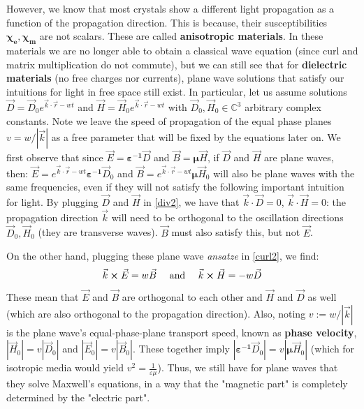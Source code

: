 \documentclass[11pt, a4paper, twoside]{article} %
\newcommand{\C}{\mathbb{C}}
\begin{document}
However, we know that most crystals show a different light propagation as a function of the propagation direction. This is because, their susceptibilities $\pmb{\chi_e},\pmb{\chi_m}$ are not scalars. These are called {\bf anisotropic materials}. In these materials we are no longer able to obtain a classical wave equation (since curl and matrix multiplication do not commute), but we can still see that for {\bf dielectric materials} (no free charges nor currents), plane wave solutions that satisfy our intuitions for light in free space still exist. In particular, let us assume solutions $\vec{D}=\vec{D}_0e^{\vec{k}\cdot\vec{r}-wt}$ and $\vec{H}=\vec{H}_0e^{\vec{k}\cdot\vec{r}-wt}$ with $\vec{D}_0,\vec{H}_0\in\C^3$ arbitrary complex constants. Note we leave the speed of propagation of the equal phase planes $v=w/|\vec{k}|$ as a free parameter that will be fixed by the equations later on. We first observe that since $\vec{E}=\pmb{\varepsilon^{-1}}\vec{D}$ and $\vec{B}=\pmb{\mu}\vec{H}$, if $\vec{D}$ and $\vec{H}$ are plane waves, then: $\vec{E}=e^{\vec{k}\cdot\vec{r}-wt}\pmb{\varepsilon^{-1}}\vec{D}_0$ and $\vec{B}=e^{\vec{k}\cdot\vec{r}-wt}\pmb{\mu}\vec{H}_0$ will also be plane waves with the same frequencies, even if they will not satisfy the following important intuition for light. By plugging $\vec{D}$ and $\vec{H}$ in \eqref{div2}, we have that $\vec{k}\cdot\vec{D}=0$, $\vec{k}\cdot\vec{H}=0$: the propagation direction $\vec{k}$ will need to be orthogonal to the oscillation directions $\vec{D}_0,\vec{H}_0$ (they are transverse waves). $\vec{B}$ must also satisfy this, but not $\vec{E}$.

 On the other hand, plugging these plane wave {\em ansatze} in \eqref{curl2}, we find:\vspace{-0.1cm}
\begin{equation}\label{Fcurl}
\vec{k}\cross\vec{E}=w\vec{B} \quad \text{           and           }\quad  \vec{k}\cross\vec{H}=-w\vec{D}\vspace{-0.1cm}
\end{equation}  
These mean that $\vec{E}$ and $\vec{B}$ are orthogonal to each other and $\vec{H}$ and $\vec{D}$ as well (which are also orthogonal to the propagation direction). Also, noting $v:=w/|\vec{k}|$ is the plane wave's equal-phase-plane transport speed, known as {\bf phase velocity}, $|\vec{H}_0|=v|\vec{D}_0|$ and $|\vec{E}_0|=v|\vec{B}_0|$. These together imply $|\pmb{\varepsilon^{-1}}\vec{D}_0|=v|\pmb{\mu}\vec{H}_0|$ (which for isotropic media would yield $v^2=\frac{1}{\varepsilon\mu}$). Thus, we still have for plane waves that they solve Maxwell's equations, in a way that the "magnetic part" is completely determined by the "electric part". \vspace{-0.2cm}
\end{document}

